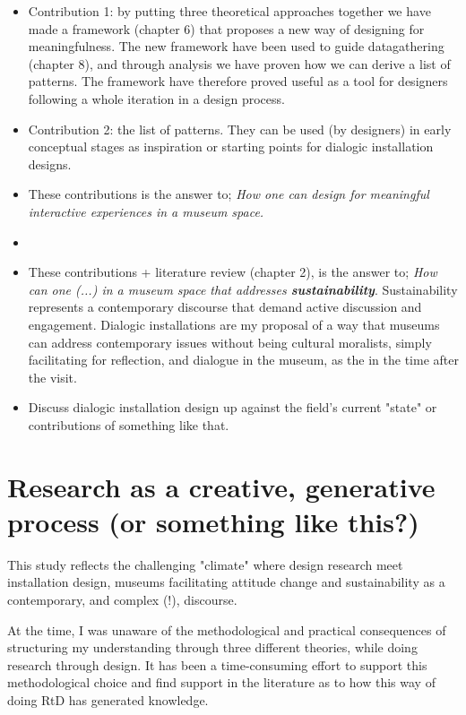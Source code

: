 \begin{itemize}
    \item Contribution 1: by putting three theoretical approaches together we have made a framework (chapter 6) that proposes a new way of designing for meaningfulness. The new framework have been used to guide datagathering (chapter 8), and through analysis we have proven how we can derive a list of patterns. The framework have therefore proved useful as a tool for designers following a whole iteration in a design process.
    
    
    \item Contribution 2: the list of patterns. They can be used (by designers) in early conceptual stages as inspiration or starting points for dialogic installation designs. 
    \item These contributions is the answer to; \emph{How one can design for meaningful interactive experiences in a museum space.}
    \item
    
     \item These contributions + literature review (chapter 2), is the answer to; \emph{How can one (...) in a museum space that addresses \textbf{sustainability}}. Sustainability represents a contemporary discourse that demand active discussion and engagement. Dialogic installations are my proposal of a way that museums can address contemporary issues without being cultural moralists, simply facilitating for reflection, and dialogue in the museum, as the  in the time after the visit. 
    \item Discuss dialogic installation design up against the field's current "state" or contributions of something like that.

\end{itemize}


\section{Research as a creative, generative process (or something like this?)}
This study reflects the challenging "climate" where design research meet installation design, museums facilitating attitude change and sustainability as a contemporary, and complex (!), discourse.

At the time, I was unaware of the methodological and practical consequences of structuring my understanding through three different theories, while doing research through design. It has been a time-consuming effort to support this methodological choice and find support in the literature as to how this way of doing RtD has generated knowledge. 






